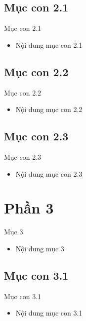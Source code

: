 \documentclass{beamer}
\begin{document}
\subsection{Mục con 2.1}
\begin{frame}{Mục con 2.1}
    \begin{itemize}
        \item Nội dung mục con 2.1
    \end{itemize}
\end{frame}

\subsection{Mục con 2.2}
\begin{frame}{Mục con 2.2}
    \begin{itemize}
        \item Nội dung mục con 2.2
    \end{itemize}
\end{frame}

\subsection{Mục con 2.3}
\begin{frame}{Mục con 2.3}
    \begin{itemize}
        \item Nội dung mục con 2.3
    \end{itemize}
\end{frame}

\section{Phần 3}
\begin{frame}{Mục 3}
    \begin{itemize}
        \item Nội dung mục 3
    \end{itemize}
\end{frame}

\subsection{Mục con 3.1}
\begin{frame}{Mục con 3.1}
    \begin{itemize}
        \item Nội dung mục con 3.1
    \end{itemize}
\end{frame}
\end{document}
